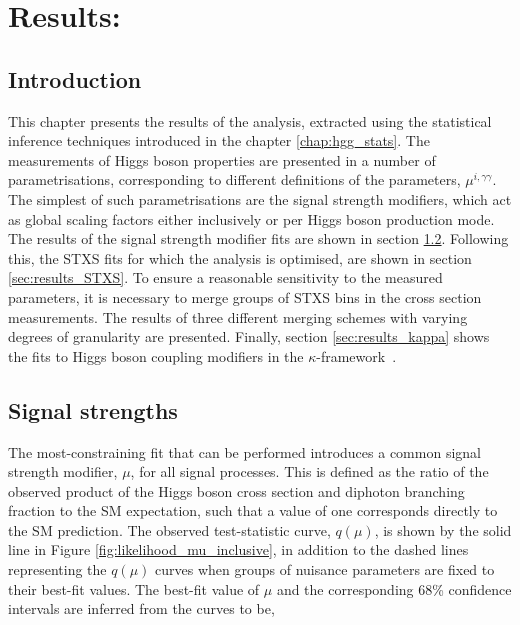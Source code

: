 \chapter{Results: \Hgg}
\label{chap:hgg_results}

\section{Introduction}
This chapter presents the results of the \Hgg analysis, extracted using the statistical inference techniques introduced in the chapter \ref{chap:hgg_stats}. The measurements of Higgs boson properties are presented in a number of parametrisations, corresponding to different definitions of the parameters, $\mu^{i,\gamma\gamma}$. The simplest of such parametrisations are the signal strength modifiers, which act as global scaling factors either inclusively or per Higgs boson production mode. The results of the signal strength modifier fits are shown in section \ref{sec:results_mu}. Following this, the STXS fits for which the analysis is optimised, are shown in section \ref{sec:results_STXS}. To ensure a reasonable sensitivity to the measured parameters, it is necessary to merge groups of STXS bins in the cross section measurements. The results of three different merging schemes with varying degrees of granularity are presented. Finally, section \ref{sec:results_kappa} shows the fits to Higgs boson coupling modifiers in the $\kappa$-framework~\cite{Heinemeyer:2013tqa}.

\section{Signal strengths}\label{sec:results_mu}
The most-constraining fit that can be performed introduces a common signal strength modifier, $\mu$, for all signal processes. This is defined as the ratio of the observed product of the Higgs boson cross section and diphoton branching fraction to the SM expectation, such that a value of one corresponds directly to the SM prediction. The observed test-statistic curve, $q(\mu)$, is shown by the solid line in Figure \ref{fig:likelihood_mu_inclusive}, in addition to the dashed lines representing the $q(\mu)$ curves when groups of nuisance parameters are fixed to their best-fit values. The best-fit value of $\mu$ and the corresponding 68\% confidence intervals are inferred from the curves to be,

